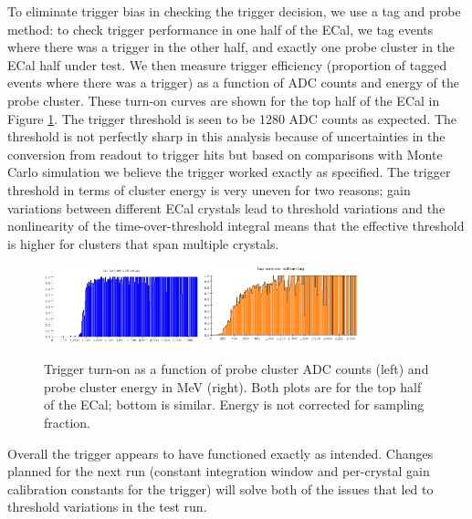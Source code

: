 To eliminate trigger bias in checking the trigger decision, we use a tag and probe method: to check trigger performance in one half of the ECal, we tag events where there was a trigger in the other half, and exactly one probe cluster in the ECal half under test. 
We then measure trigger efficiency (proportion of tagged events where there was a trigger) as a function of ADC counts and energy of the probe cluster.
These turn-on curves are shown for the top half of the ECal in Figure \ref{fig:turnon}. 
The trigger threshold is seen to be 1280 ADC counts as expected. The threshold is not perfectly sharp in this analysis because of uncertainties in the conversion from readout to trigger hits but based on comparisons with Monte Carlo simulation we believe the trigger worked exactly as specified. 
The trigger threshold in terms of cluster energy is very uneven for two reasons; gain variations between different ECal crystals lead to threshold variations and the nonlinearity of the time-over-threshold integral means that the effective threshold is higher for clusters that span multiple crystals.
\begin{figure}[ht]
	\includegraphics[width=0.4\textwidth]{test2012/ecalperformance/top_turnon_adc}
	\includegraphics[width=0.4\textwidth]{test2012/ecalperformance/top_turnon_e}
	\caption{\small{Trigger turn-on as a function of probe cluster ADC counts (left) and probe cluster energy in MeV (right). Both plots are for the top half of the ECal; bottom is similar. 
	Energy is not corrected for sampling fraction.}}
	\label{fig:turnon}
\end{figure}
Overall the trigger appears to have functioned exactly as intended. Changes planned for the next run (constant integration window and per-crystal gain calibration constants for the trigger) will solve both of the issues that led to threshold variations in the test run.

%


